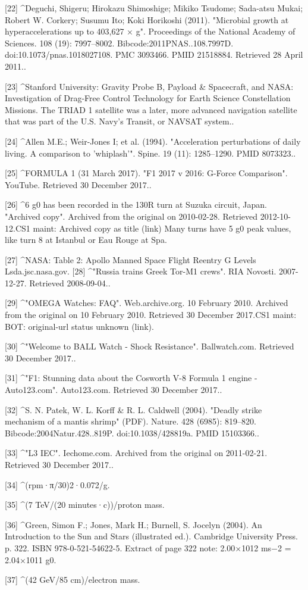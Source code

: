 [22]
^Deguchi, Shigeru; Hirokazu Shimoshige; Mikiko Tsudome; Sada-atsu Mukai; Robert W. Corkery; Susumu Ito; Koki Horikoshi (2011). "Microbial growth at hyperaccelerations up to 403,627 × g". Proceedings of the National Academy of Sciences. 108 (19): 7997–8002. Bibcode:2011PNAS..108.7997D. doi:10.1073/pnas.1018027108. PMC 3093466. PMID 21518884. Retrieved 28 April 2011..

[23]
^Stanford University: Gravity Probe B, Payload & Spacecraft, and NASA: Investigation of Drag-Free Control Technology for Earth Science Constellation Missions. The TRIAD 1 satellite was a later, more advanced navigation satellite that was part of the U.S. Navy’s Transit, or NAVSAT system..

[24]
^Allen M.E.; Weir-Jones I; et al. (1994). "Acceleration perturbations of daily living. A comparison to 'whiplash'". Spine. 19 (11): 1285–1290. PMID 8073323..

[25]
^FORMULA 1 (31 March 2017). "F1 2017 v 2016: G-Force Comparison". YouTube. Retrieved 30 December 2017..

[26]
^6 g0 has been recorded in the 130R turn at Suzuka circuit, Japan. "Archived copy". Archived from the original on 2010-02-28. Retrieved 2012-10-12.CS1 maint: Archived copy as title (link) Many turns have 5 g0 peak values, like turn 8 at Istanbul or Eau Rouge at Spa.

[27]
^NASA: Table 2: Apollo Manned Space Flight Reentry G Levels Lsda.jsc.nasa.gov.
[28]
^"Russia trains Greek Tor-M1 crews". RIA Novosti. 2007-12-27. Retrieved 2008-09-04..

[29]
^"OMEGA Watches: FAQ". Web.archive.org. 10 February 2010. Archived from the original on 10 February 2010. Retrieved 30 December 2017.CS1 maint: BOT: original-url status unknown (link).

[30]
^"Welcome to BALL Watch - Shock Resistance". Ballwatch.com. Retrieved 30 December 2017..

[31]
^"F1: Stunning data about the Cosworth V-8 Formula 1 engine - Auto123.com". Auto123.com. Retrieved 30 December 2017..

[32]
^S. N. Patek, W. L. Korff & R. L. Caldwell (2004). "Deadly strike mechanism of a mantis shrimp" (PDF). Nature. 428 (6985): 819–820. Bibcode:2004Natur.428..819P. doi:10.1038/428819a. PMID 15103366..

[33]
^"L3 IEC". Iechome.com. Archived from the original on 2011-02-21. Retrieved 30 December 2017..

[34]
^(rpm·π/30)2·0.072/g.

[35]
^(7 TeV/(20 minutes·c))/proton mass.

[36]
^Green, Simon F.; Jones, Mark H.; Burnell, S. Jocelyn (2004). An Introduction to the Sun and Stars (illustrated ed.). Cambridge University Press. p. 322. ISBN 978-0-521-54622-5. Extract of page 322 note: 2.00×1012 ms−2 = 2.04×1011 g0.

[37]
^(42 GeV/85 cm)/electron mass.